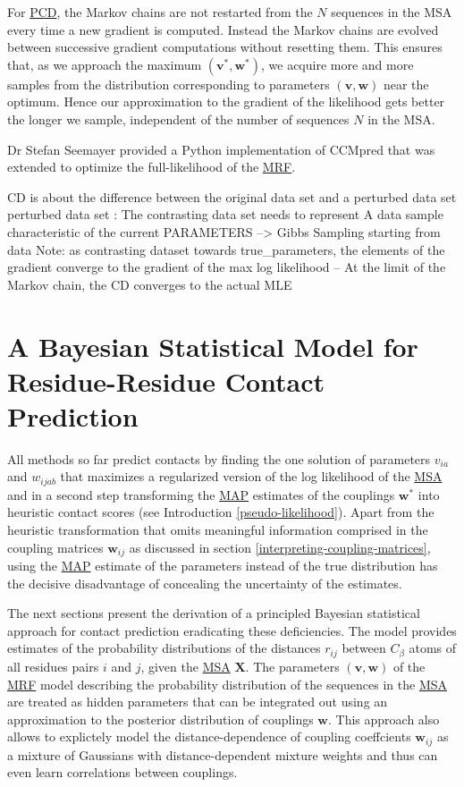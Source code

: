 \documentclass[12pt,a4paper,twoside]{book}
\newcommand{\Cb}{C_\beta}
\newcommand{\rij}{r_{ij}}
\renewcommand{\v}{\mathbf{v}}
\newcommand{\via}{v_{ia}}
\newcommand{\w}{\mathbf{w}}
\newcommand{\wij}{\mathbf{w}_{ij}}
\newcommand{\wijab}{w_{ijab}}
\newcommand{\X}{\mathbf{X}}
\theoremstyle{definition}
\theoremstyle{definition}
\theoremstyle{remark}
\begin{document}
For \protect\hyperlink{abbrev}{PCD}, the Markov chains are not restarted
from the \(N\) sequences in the MSA every time a new gradient is
computed. Instead the Markov chains are evolved between successive
gradient computations without resetting them. This ensures that, as we
approach the maximum \((\v^*, \w^*)\), we acquire more and more samples
from the distribution corresponding to parameters \((\v,\w)\) near the
optimum. Hence our approximation to the gradient of the likelihood gets
better the longer we sample, independent of the number of sequences
\(N\) in the MSA.

Dr Stefan Seemayer provided a Python implementation of CCMpred that was
extended to optimize the full-likelihood of the
\protect\hyperlink{abbrev}{MRF}.

CD is about the difference between the original data set and a perturbed
data set perturbed data set : The contrasting data set needs to
represent A data sample characteristic of the current PARAMETERS
--\textgreater{} Gibbs Sampling starting from data Note: as contrasting
dataset towards true\_parameters, the elements of the gradient converge
to the gradient of the max log likelihood -- At the limit of the Markov
chain, the CD converges to the actual MLE

\chapter{A Bayesian Statistical Model for Residue-Residue Contact
Prediction}\label{a-bayesian-statistical-model-for-residue-residue-contact-prediction}

All methods so far predict contacts by finding the one solution of
parameters \(\via\) and \(\wijab\) that maximizes a regularized version
of the log likelihood of the \protect\hyperlink{abbrev}{MSA} and in a
second step transforming the \protect\hyperlink{abbrev}{MAP} estimates
of the couplings \(\w^*\) into heuristic contact scores (see
Introduction \ref{pseudo-likelihood}). Apart from the heuristic
transformation that omits meaningful information comprised in the
coupling matrices \(\wij\) as discussed in section
\ref{interpreting-coupling-matrices}, using the
\protect\hyperlink{abbrev}{MAP} estimate of the parameters instead of
the true distribution has the decisive disadvantage of concealing the
uncertainty of the estimates.

The next sections present the derivation of a principled Bayesian
statistical approach for contact prediction eradicating these
deficiencies. The model provides estimates of the probability
distributions of the distances \(\rij\) between \(\Cb\) atoms of all
residues pairs \(i\) and \(j\), given the
\protect\hyperlink{abbrev}{MSA} \(\X\). The parameters \((\v, \w)\) of
the \protect\hyperlink{abbrev}{MRF} model describing the probability
distribution of the sequences in the \protect\hyperlink{abbrev}{MSA} are
treated as hidden parameters that can be integrated out using an
approximation to the posterior distribution of couplings \(\w\). This
approach also allows to explictely model the distance-dependence of
coupling coeffcients \(\wij\) as a mixture of Gaussians with
distance-dependent mixture weights and thus can even learn correlations
between couplings.
\end{document}
